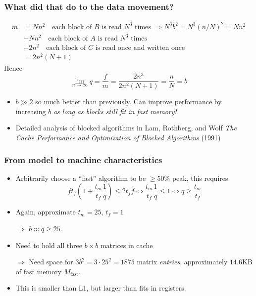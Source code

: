 \documentclass[presentation,aspectratio=43,10pt]{beamer}
\begin{document}
\begin{frame}
  \frametitle{What did that do to the data movement?}
  \begin{align*}
    m &= N n^2 \quad \text{each block of $B$ is read $N^3$ times
        $\Rightarrow N^3 b^2 = N^3 (n/N)^2 = N n^2$}\\
      &+ N n^2 \quad \text{each block of $A$ is read $N^3$ times}\\
      &+ 2 n^2 \quad \text{each block of $C$ is read once and written
        once}\\
      &= 2n^2(N+1)
  \end{align*}
  Hence
  \begin{equation*}
    \lim_{n\to\infty} q = \frac{f}{m} = \frac{2 n^3}{2n^2(N + 1)} =
    \frac{n}{N} = b
  \end{equation*}

  
  \begin{itemize}
  \item $b \gg 2$ so much better than previously. Can improve
    performance by increasing $b$ \emph{as long as blocks still fit in
      fast memory!}
  \item Detailed analysis of blocked algorithms in Lam, Rothberg, and
    Wolf \emph{The Cache Performance and Optimization of Blocked
      Algorithms} (1991)
  \end{itemize}
\end{frame}
\begin{frame}
  \frametitle{From model to machine characteristics}
  \begin{itemize}
  \item Arbitrarily choose a ``fast'' algorithm to be $\ge 50\%$ peak,
    this requires
    \begin{equation*}
      f t_f \left(1 + \frac{t_m}{t_f}\frac{1}{q}\right) \le 2 t_f f \Leftrightarrow \frac{t_m}{t_f}\frac{1}{q} \le 1
      \Leftrightarrow q \ge \frac{t_m}{t_f}
    \end{equation*}
  \item Again, approximate $t_m = 25$, $t_f = 1$
  \item[$\Rightarrow$] $b \approx q \ge 25$.
  \item Need to hold all three $b \times b$ matrices in cache
    
  \item[$\Rightarrow$] Need space for $3 b^2 = 3 \cdot 25^2 = 1875$
    matrix \emph{entries}, approximately $14.6$KB of fast memory $M_\text{fast}$.
  \item This is smaller than L1, but larger than fits in registers.
  \end{itemize}
\end{frame}
\end{document}
